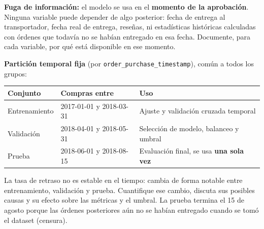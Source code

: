 \documentclass[11pt,letterpaper]{article}
\newcommand{\thead}[1]{\color{white}\bfseries\small #1}
\newcommand{\headrow}{\rowcolor{eafitnavy}}
\newcommand{\tabla}[1]{\texttt{#1}}
\begin{document}
\begin{warnbox}
  {\color{eafitred}\bfseries Fuga de información:} el modelo se usa en el \textbf{momento de la aprobación}. Ninguna variable puede depender de algo posterior: fecha de entrega al transportador, fecha real de entrega, reseñas, ni estadísticas históricas calculadas con órdenes que todavía no se habían entregado en esa fecha. Documente, para cada variable, por qué está disponible en ese momento.
\end{warnbox}

\textbf{Partición temporal fija} (por \tabla{order\_purchase\_timestamp}), común a todos los grupos:\par
{\small\renewcommand{\arraystretch}{1.35}
\begin{tabularx}{\textwidth}{|L{3.0cm}|L{5.0cm}|Y|}
  \hline
  \headrow \thead{Conjunto} & \thead{Compras entre} & \thead{Uso} \\ \hline
  Entrenamiento & 2017-01-01 y 2018-03-31 & Ajuste y validación cruzada temporal \\ \hline
  Validación    & 2018-04-01 y 2018-05-31 & Selección de modelo, balanceo y umbral \\ \hline
  Prueba        & 2018-06-01 y 2018-08-15 & Evaluación final, se usa \textbf{una sola vez} \\ \hline
\end{tabularx}}

La tasa de retraso no es estable en el tiempo: cambia de forma notable entre entrenamiento, validación y prueba. Cuantifique ese cambio, discuta sus posibles causas y su efecto sobre las métricas y el umbral. La prueba termina el 15 de agosto porque las órdenes posteriores aún no se habían entregado cuando se tomó el dataset (censura).
\end{document}

